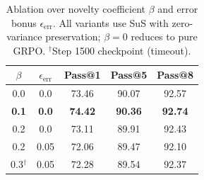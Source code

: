 \begin{table}[t]
\centering
\small
\caption{Ablation over novelty coefficient $\beta$ and error bonus $\epsilon_{\text{err}}$. All variants use SuS with zero-variance preservation; $\beta{=}0$ reduces to pure GRPO. $^\dagger$Step 1500 checkpoint (timeout).}
\label{tab:ablation}
\begin{tabular}{@{}cc ccc@{}}
\toprule
$\beta$ & $\epsilon_{\text{err}}$ & Pass@1 & Pass@5 & Pass@8 \\
\midrule
0.0 & 0.0 & 73.46 & 90.07 & 92.57 \\
\textbf{0.1} & \textbf{0.0} & \textbf{74.42} & \textbf{90.36} & \textbf{92.74} \\
0.2 & 0.0 & 73.11 & 89.91 & 92.43 \\
0.2 & 0.05 & 72.06 & 89.47 & 92.10 \\
0.3$^\dagger$ & 0.05 & 72.28 & 89.54 & 92.37 \\
\bottomrule
\end{tabular}
\end{table}

